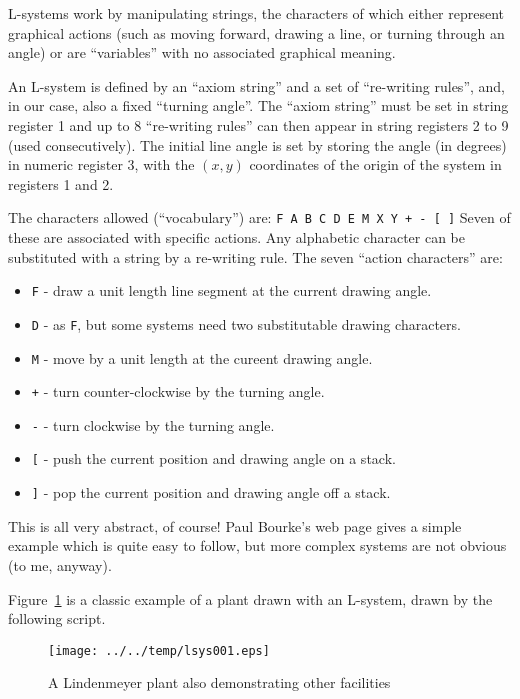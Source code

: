 \documentclass[a4paper,twoside,11pt]{article}
\makeatletter
\def\maxwidth{%
  \ifdim\Gin@nat@width>\linewidth
    \linewidth
  \else
    \Gin@nat@width
  \fi
}
\newcommand{\newpara}{\par\vspace{4mm}\noindent}
\makeatother
\begin{document}
\newpara
L-systems work by manipulating strings, the characters of which either
represent graphical actions (such as moving forward, drawing a line, or
turning through an angle) or are ``variables'' with no associated
graphical meaning.

\newpara
An L-system is defined by an ``axiom string'' and a set of ``re-writing
rules'', and, in our case, also a fixed ``turning angle''. The ``axiom
string'' must be set in string register 1 and up to 8 ``re-writing
rules'' can then appear in string registers 2 to 9 (used consecutively).
The initial line angle is set by storing the angle (in degrees) in
numeric register 3, with the $(x,y)$ coordinates
of the origin of the system in registers 1 and 2.

\newpara
The characters allowed (``vocabulary'') are:
\texttt{F\ A\ B\ C\ D\ E\ M\ X\ Y\ +\ -\ {[}\ {]}} Seven of these are
associated with specific actions. Any alphabetic character can be
substituted with a string by a re-writing rule. The seven ``action
characters'' are:

\begin{itemize}
\item
  \texttt{F} - draw a unit length line segment at the current drawing
  angle.
\item
  \texttt{D} - as \texttt{F}, but some systems need two substitutable
  drawing characters.
\item
  \texttt{M} - move by a unit length at the cureent drawing angle.
\item
  \texttt{+} - turn counter-clockwise by the turning angle.
\item
  \texttt{-} - turn clockwise by the turning angle.
\item
  \texttt{{[}} - push the current position and drawing angle on a stack.
\item
  \texttt{{]}} - pop the current position and drawing angle off a stack.
\end{itemize}

\newpara
This is all very abstract, of course! Paul Bourke's web page gives a
simple example which is quite easy to follow, but more complex systems
are not obvious (to me, anyway).

\newpara
Figure~\ref{fig:lsys001} is a classic example of a plant drawn with an L-system,
drawn by the following script.

\begin{figure}
  \centering
  \texttt{[image: ../../temp/lsys001.eps]}
  \caption{A Lindenmeyer plant also demonstrating other facilities}
  \label{fig:lsys001}
\end{figure}
\end{document}
